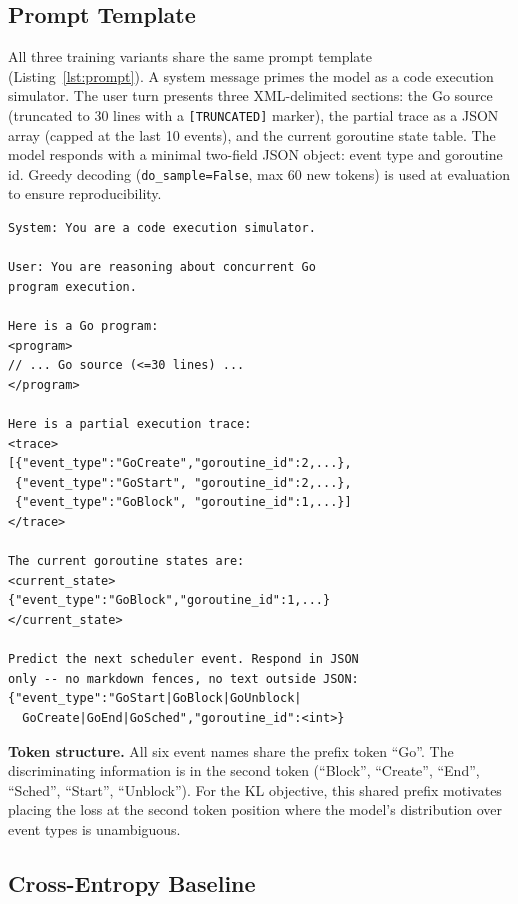 \documentclass[10pt,conference]{IEEEtran}
\begin{document}
\subsection{Prompt Template}\label{sec:prompt}

All three training variants share the same prompt template
(Listing~\ref{lst:prompt}).
A system message primes the model as a code execution simulator.
The user turn presents three XML-delimited sections: the Go source
(truncated to 30 lines with a \texttt{[TRUNCATED]} marker), the
partial trace as a JSON array (capped at the last 10 events), and the
current goroutine state table.
The model responds with a minimal two-field JSON object: event type and
goroutine id.
Greedy decoding (\texttt{do\_sample=False}, max 60 new tokens) is used
at evaluation to ensure reproducibility.

\begin{lstlisting}[float, caption={Prompt template (condensed from actual code).
The trace is capped at the last 10 events; programs over 30 lines are
truncated. The model's output is always a two-field JSON object.},
label={lst:prompt}]
System: You are a code execution simulator.

User: You are reasoning about concurrent Go
program execution.

Here is a Go program:
<program>
// ... Go source (<=30 lines) ...
</program>

Here is a partial execution trace:
<trace>
[{"event_type":"GoCreate","goroutine_id":2,...},
 {"event_type":"GoStart", "goroutine_id":2,...},
 {"event_type":"GoBlock", "goroutine_id":1,...}]
</trace>

The current goroutine states are:
<current_state>
{"event_type":"GoBlock","goroutine_id":1,...}
</current_state>

Predict the next scheduler event. Respond in JSON
only -- no markdown fences, no text outside JSON:
{"event_type":"GoStart|GoBlock|GoUnblock|
  GoCreate|GoEnd|GoSched","goroutine_id":<int>}
\end{lstlisting}

\textbf{Token structure.}
All six event names share the prefix token ``Go''.
The discriminating information is in the second token (``Block'',
``Create'', ``End'', ``Sched'', ``Start'', ``Unblock'').
For the KL objective, this shared prefix motivates placing the loss
at the second token position where the model's distribution over event
types is unambiguous.

\subsection{Cross-Entropy Baseline}\label{sec:ce}
\end{document}
